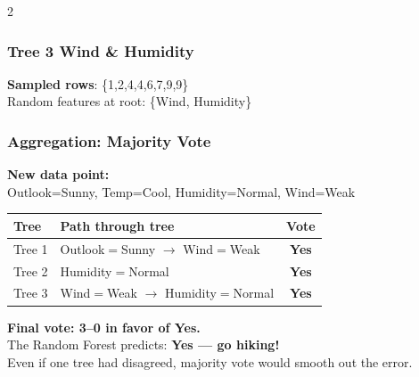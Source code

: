 \documentclass[10pt,a4paper]{article}
\begin{document}
\begin{multicols}{2}
\subsubsection{Tree 3\;\; \textcolor{amber}{Wind \& Humidity}}

\textbf{Sampled rows}: \{1,2,4,4,6,7,9,9\}\\
Random features at root: \{Wind, Humidity\}

\begin{center}
\end{center}

\columnbreak

\subsubsection{Aggregation: Majority Vote}

\textbf{New data point:}\\
Outlook=Sunny, Temp=Cool, Humidity=Normal, Wind=Weak

\medskip

\renewcommand{\arraystretch}{1.4}
{\small
\begin{tabular}{@{}llc@{}}
\textbf{\color{sky}Tree} & \textbf{Path through tree} & \textbf{Vote}\\
\hline
Tree 1 & Outlook$=$Sunny $\to$ Wind$=$Weak & \textcolor{accent}{\textbf{Yes}}\\
Tree 2 & Humidity$=$Normal & \textcolor{accent}{\textbf{Yes}}\\
Tree 3 & Wind$=$Weak $\to$ Humidity$=$Normal & \textcolor{accent}{\textbf{Yes}}\\
\end{tabular}}

\vspace{6pt}

\begin{resultbox}
\textbf{Final vote: 3--0 in favor of Yes.}\\[2pt]
The Random Forest predicts: \textbf{\color{accent}Yes --- go hiking!}\\[2pt]
{\small Even if one tree had disagreed, majority vote would smooth out the error.}
\end{resultbox}


\end{multicols}
\end{document}
